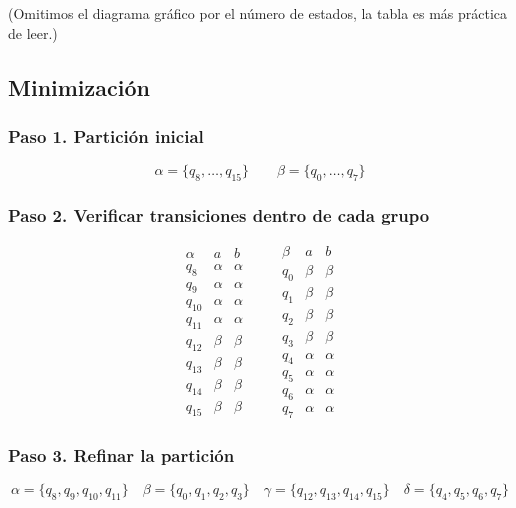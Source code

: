 \documentclass[12pt,letterpaper]{article}
\begin{document}
\begin{enumerate}[label=\arabic*.]
\begin{enumerate}
    (Omitimos el diagrama gráfico por el número de estados, la tabla es más práctica de leer.)\\

    \medskip
    
    \subsection*{Minimización}

    \subsubsection*{Paso 1. Partición inicial}
    \[
    \alpha = \{q_8,\dots,q_{15}\} \qquad \beta = \{q_0,\dots,q_7\}
    \]

    \subsubsection*{Paso 2. Verificar transiciones dentro de cada grupo}
    \[
    \begin{array}{c|cc}
      \alpha & a & b \\ \hline
      q_8 & \alpha & \alpha \\
      q_9 & \alpha & \alpha \\
      q_{10} & \alpha & \alpha \\
      q_{11} & \alpha & \alpha \\
      q_{12} & \beta & \beta \\
      q_{13} & \beta & \beta \\
      q_{14} & \beta & \beta \\
      q_{15} & \beta & \beta
    \end{array}
    \qquad
    \begin{array}{c|cc}
      \beta & a & b \\ \hline
      q_0 & \beta & \beta \\
      q_1 & \beta & \beta \\
      q_2 & \beta & \beta \\
      q_3 & \beta & \beta \\
      q_4 & \alpha & \alpha \\
      q_5 & \alpha & \alpha \\
      q_6 & \alpha & \alpha \\
      q_7 & \alpha & \alpha
    \end{array}
    \]

    \subsubsection*{Paso 3. Refinar la partición}
    \[
    \alpha = \{q_8,q_9,q_{10},q_{11}\} \quad \beta = \{q_0,q_1,q_2,q_3\} \quad \gamma = \{q_{12},q_{13},q_{14},q_{15}\} \quad \delta = \{q_4,q_5,q_6,q_7\}
    \]


\end{enumerate}
\end{enumerate}
\end{document}
